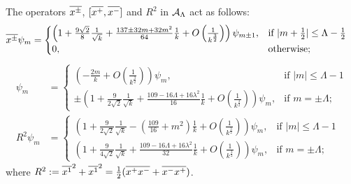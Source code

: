 \begin{proposition}
The operators $\overline{x^\pm}$, $[\overline{x^+}, \overline{x^-}]$ and $R^2$ in $\mathcal A_\Lambda$ act as follows:
\begin{align}
    \overline{x^\pm}  \psi_m
        &= \begin{cases}
        \left(1 + \frac{9 \sqrt{2}}{8} \frac{1}{\sqrt{k}} + \frac{137 \pm 32m + 32m^2}{64} \frac{1}{k} + O\left(\frac{1}{k^{\frac{3}{2}}}\right) \right) \psi_{m \pm 1}, & \text{if }  |m + \frac{1}{2}| \leq \Lambda - \frac{1}{2}
        \\
        0, & \text{otherwise};
        \end{cases}
\end{align}
\begin{align}
    [\cut{x^+}, \cut{x^-}]  \psi_m
        &= \begin{cases}
        \left( -\frac{2m}{k}  + O\left(\frac{1}{k^{\frac{3}{2}}}\right) \right) \psi_{m}, & \text{if } |m| \leq \Lambda -1
        \\
        \pm \left( 1 + \frac{9}{2\sqrt{2}} \frac{1}{\sqrt{k}} +  \frac{109-16\Lambda + 16\lambda^2}{16} \frac{1}{k} + O\left(\frac{1}{k^{\frac{3}{2}}}\right) \right) \psi_{m}, & \text{if } m = \pm \Lambda ;
        \end{cases}\\
    R^2  \psi_m
        &= \begin{cases}
        \left( 1+ \frac{9}{2\sqrt{2}} \frac{1}{\sqrt{k}} -\left(\frac{109}{16}+m^2\right) \frac{1}{k}  + O\left(\frac{1}{k^{\frac{3}{2}}}\right) \right) \psi_{m}, & \text{if } |m| \leq \Lambda -1
        \\
        \left( 1+ \frac{9}{4\sqrt{2}} \frac{1}{\sqrt{k}} + \frac{109-16\Lambda+16\lambda^2}{32} \frac{1}{k} + O\left(\frac{1}{k^{\frac{3}{2}}}\right) \right) \psi_{m}, & \text{if } m = \pm \Lambda;
        \end{cases}
\end{align}
where $R^2 := \overline{x^1}^2 + \overline{x^1}^2 = \frac{1}{2}(\overline{x^+}\overline{x^-} + \overline{x^-}\overline{x^+})$.
\end{proposition}
